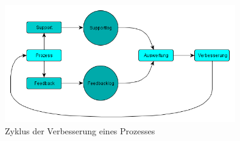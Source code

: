 \begin{figure}[h!]
	\centering
	\includegraphics[width=10cm]{kapitel/gruppe3/bilder/zyklus_prozessverbesserung}
	\caption{Zyklus der Verbesserung eines Prozesses}
	\label{fig_zyklus_prozessverbesserung}
\end{figure}





















